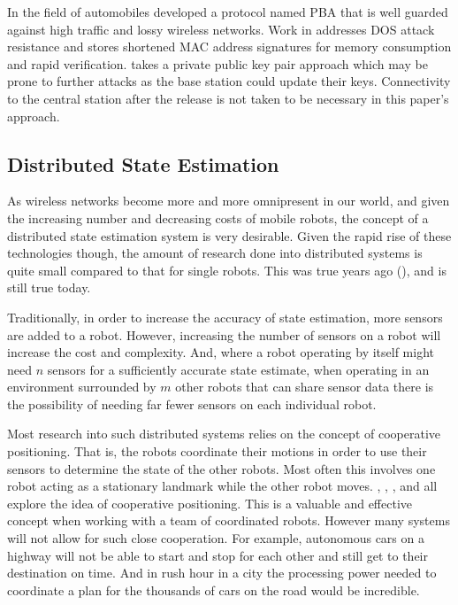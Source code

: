 \documentclass[conference]{IEEEtran}
\begin{document}
In the field of automobiles \cite{lyu2016pba} developed a protocol named PBA that is well guarded against high traffic and lossy wireless networks. Work in \cite{lyu2016pba} addresses DOS attack resistance and stores shortened MAC address signatures for memory consumption and rapid verification. \cite{lyu2016pba} takes a private public key pair approach which may be prone to further attacks as the base station could update their keys. Connectivity to the central station after the release is not taken to be necessary in this paper's approach.

\subsection{Distributed State Estimation}
As wireless networks become more and more omnipresent in our world, and given the increasing number and decreasing costs of mobile robots, the concept of a distributed state estimation system is very desirable. Given the rapid rise of these technologies though, the amount of research done into distributed systems is quite small compared to that for single robots. This was true years ago (\cite{Parker2000}), and is still true today.

Traditionally, in order to increase the accuracy of state estimation, more sensors are added to a robot. However, increasing the number of sensors on a robot will increase the cost and complexity. And, where a robot operating by itself might need $n$ sensors for a sufficiently accurate state estimate, when operating in an environment surrounded by $m$ other robots that can share sensor data there is the possibility of needing far fewer sensors on each individual robot.

Most research into such distributed systems relies on the concept of cooperative positioning. That is, the robots coordinate their motions in order to use their sensors to determine the state of the other robots. Most often this involves one robot acting as a stationary landmark while the other robot moves. \cite{Kurazume1994}, \cite{Kurazume1996}, \cite{Kurazume1998}, and \cite{Kurazume2000} all explore the idea of cooperative positioning. This is a valuable and effective concept when working with a team of coordinated robots. However many systems will not allow for such close cooperation. For example, autonomous cars on a highway will not be able to start and stop for each other and still get to their destination on time. And in rush hour in a city the processing power needed to coordinate a plan for the thousands of cars on the road would be incredible.
\end{document}
